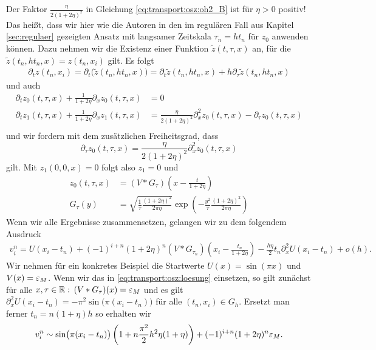 Der Faktor $\frac{\eta}{2 (1 + 2 \eta)^2}$ in Gleichung \eqref{eq:transport:osz:oh2_B} ist für $\eta > 0$ positiv!
Das heißt, dass wir hier wie die Autoren in \cite{Junk2004} den im regulären Fall aus Kapitel \ref{sec:regulaer} gezeigten Ansatz mit langsamer Zeitskala $\tau_n = h t_n$ für $z_0$ anwenden können.
Dazu nehmen wir die Existenz einer Funktion $\tilde z(t,\tau,x)$ an, für die $\tilde z(t_n, h t_n, x) = z(t_n,x_i)$ gilt.
Es folgt
\begin{align*}
\partial_t z(t_n,x_i) = \partial_t \bigl( \tilde z(t_n, h t_n, x) \bigr) = \partial_t \tilde z(t_n, h t_n, x) + h \partial_\tau \tilde z(t_n, h t_n, x)
\end{align*}
und auch
\begin{align*}
\partial_t z_0(t, \tau, x) + \frac {1} {1 + 2 \eta} \partial_x z_0(t, \tau, x) &= 0\\
\partial_t z_1(t, \tau, x) + \frac {1} {1 + 2 \eta} \partial_x z_1(t, \tau, x) &= \frac{\eta}{2 (1 + 2 \eta)^2} \partial^2_x z_0(t, \tau, x) - \partial_\tau z_0(t, \tau, x)\\
\end{align*}
und wir fordern mit dem zusätzlichen Freiheitsgrad, dass
\[ 
\partial_\tau z_0(t, \tau, x) = \frac{\eta}{2 (1 + 2 \eta)^2} \partial^2_x z_0(t, \tau, x) 
\]
gilt. Mit $z_1(0,0,x) = 0$ folgt also $z_1 = 0$ und
\begin{align*}
z_0(t, \tau, x) &= (V * G_\tau)\left(x - \frac{t}{1 + 2 \eta} \right) \\
G_\tau(y) &= \sqrt {\frac{1}{\tau} \frac {(1 + 2 \eta)^2}{2 \pi \eta}} \exp\left( - \frac{y^2}{\tau} \frac {(1 + 2 \eta)^2}{2 \pi \eta} \right)
\end{align*}
Wenn wir alle Ergebnisse zusammensetzen, gelangen wir zu dem folgendem Ausdruck
\begin{align}\label{eq:transport:osz:loesung}
v^n_i = U(x_i - t_n) + (-1)^{i+n} (1+ 2 \eta)^n (V * G_{\tau_n})\left(x_i - \frac{t_n}{1 + 2 \eta} \right) - \frac{h\eta} 2 t_n \partial^2_x U(x_i - t_n) + o(h).
\end{align}
Wir nehmen für ein konkretes Beispiel die Startwerte $U(x) = \sin(\pi x)$ und $V(x) = \varepsilon_M$.
Wenn wir das in \eqref{eq:transport:osz:loesung} einsetzen, so gilt zunächst für alle $x, \tau \in \mathbb R:$ $(V * G_\tau)(x) = \varepsilon_M$ und es gilt $\partial^2_x U(x_i - t_n) = -\pi^2 \sin\bigl(\pi (x_i - t_n)\bigr)$ für alle $(t_n, x_i) \in G_h$.
Ersetzt man ferner $t_n = n (1+\eta) h$ so erhalten wir
\begin{align}
v^n_i \sim \sin\bigl(\pi (x_i - t_n) \bigr)\left( 1 + n \frac {\pi^2} 2 h^2 \eta (1 + \eta) \right)  + (-1)^{i+n} (1 + 2 \eta)^n \varepsilon_M .
\end{align}
